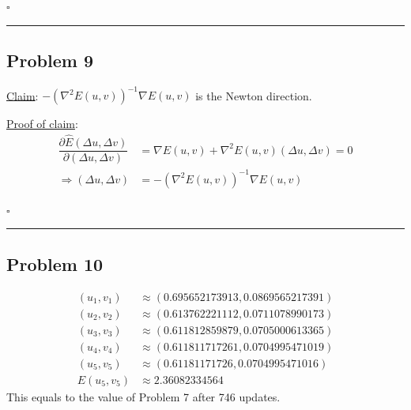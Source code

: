 \documentclass[12pt]{article}
\newcommand*{\QEDB}{\hfill\ensuremath{\square}}
\newcommand{\ParTh}[1]{\left(#1\right)}
\newcommand{\horrule}[1]{\rule{\linewidth}{#1}}
\begin{document}
\QEDB

\horrule{0.5pt}

\subsection*{Problem 9}

\underline{Claim}: $-\ParTh{\nabla^2E\ParTh{u,v}}^{-1}\nabla E\ParTh{u,v}$ is the Newton direction.

\underline{Proof of claim}:
\begin{align}
\dfrac{\partial\hat{E}\ParTh{\Delta u,\Delta v}}{\partial\ParTh{\Delta u,\Delta v}}&=\nabla E\ParTh{u,v}+\nabla^2E\ParTh{u,v}\ParTh{\Delta u,\Delta v}=0\\
\Rightarrow\ParTh{\Delta u,\Delta v}&=-\ParTh{\nabla^2E\ParTh{u,v}}^{-1}\nabla E\ParTh{u,v}
\end{align}

\QEDB

\horrule{0.5pt}

\subsection*{Problem 10}

\begin{align}
\ParTh{u_1,v_1}&\approx\ParTh{0.695652173913, 0.0869565217391}\\
\ParTh{u_2,v_2}&\approx\ParTh{0.613762221112, 0.0711078990173}\\
\ParTh{u_3,v_3}&\approx\ParTh{0.611812859879, 0.0705000613365}\\
\ParTh{u_4,v_4}&\approx\ParTh{0.611811717261, 0.0704995471019}\\
\ParTh{u_5,v_5}&\approx\ParTh{0.61181171726, 0.0704995471016}\\
E\ParTh{u_5,v_5}&\approx2.36082334564
\end{align}
This equals to the value of Problem 7 after 746 updates.
\end{document}
